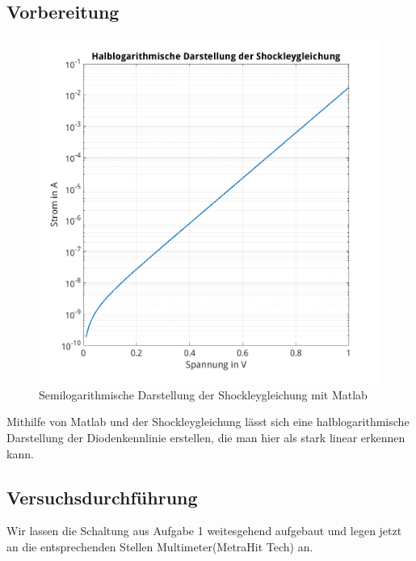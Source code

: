\documentclass{article}
\begin{document}
\subsection{Vorbereitung}

\begin{figure}[h]
  \centering
  \includegraphics[scale=0.4]{../assets/images/EL1P2/VorbereitungSemilogDiode2.png}
  \caption{Semilogarithmische Darstellung der Shockleygleichung mit Matlab}
  \label{fig:vsemilog}
\end{figure}

Mithilfe von Matlab und der Shockleygleichung lässt sich eine halblogarithmische Darstellung der Diodenkennlinie erstellen, die man hier als stark linear erkennen kann.

\subsection{Versuchsdurchführung}

Wir lassen die Schaltung aus Aufgabe 1 weitesgehend aufgebaut und legen jetzt an die entsprechenden Stellen Multimeter(MetraHit Tech) an.
\end{document}

